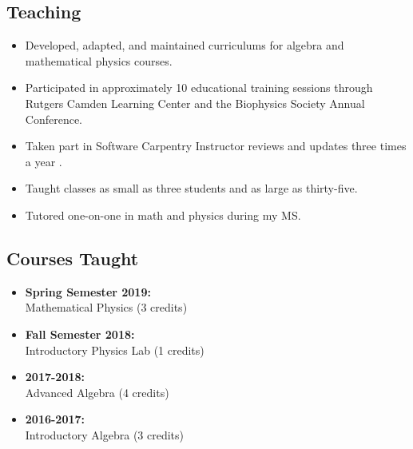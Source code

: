 \subsection*{Teaching}
\begin{itemize}
	\item Developed, adapted, and maintained curriculums for algebra and mathematical physics courses. 
	\item Participated in approximately 10 educational training sessions through Rutgers Camden Learning Center and the Biophysics Society Annual Conference.
	\item Taken part in Software Carpentry Instructor reviews and updates three times a year .
	\item Taught classes as small as three students and as large as thirty-five.
	\item Tutored one-on-one in math and physics during my MS.
	\vspace{2pt}
\end{itemize}
\vspace{4pt}
\subsection*{Courses Taught}
\begin{itemize}
	\item \textbf{Spring Semester 2019:} \\Mathematical Physics (3 credits)
	\vspace{2pt}
	\item \textbf{Fall Semester 2018:} \\Introductory Physics Lab (1 credits)
	\vspace{2pt}
	\item \textbf{2017-2018:} \\Advanced Algebra (4 credits)
	\vspace{2pt}
	\item \textbf{2016-2017:} \\Introductory Algebra (3 credits)
\end{itemize}
